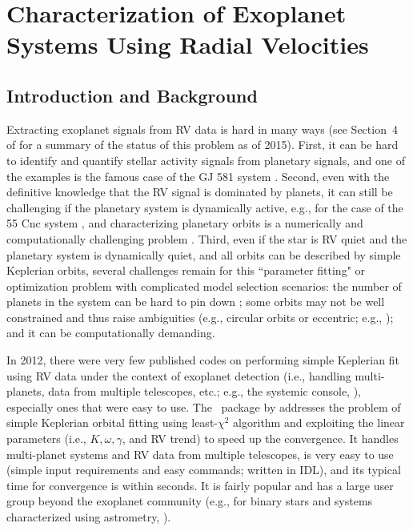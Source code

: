 \chapter{Characterization of Exoplanet Systems Using Radial
  Velocities}


\section{Introduction and Background}\label{boottran:sec:intro}

Extracting exoplanet signals from RV data is hard in many ways (see
Section~4 of \citealt{eprv2015} for a summary of the status of this
problem as of 2015). First, it can be hard to identify and quantify
stellar activity signals from planetary signals, and one of the
examples is the famous case of the GJ 581 system
\citep{2009A&A...507..487M, 2010ApJ...723..954V, 2013AN....334..616H,
  2014Sci...345..440R, 2015Sci...347.1080A,
  2015Sci...347.1080R}. Second, even with the definitive knowledge
that the RV signal is dominated by planets, it can still be
challenging if the planetary system is dynamically active, e.g., for
the case of the 55 Cnc system \citep{2014MNRAS.441..442N}, and
characterizing planetary orbits is a numerically and computationally
challenging problem \citep{2014ApJS..210...11N}. Third, even if the
star is RV quiet and the planetary system is dynamically quiet, and
all orbits can be described by simple Keplerian orbits, several
challenges remain for this ``parameter fitting" or optimization
problem with complicated model selection scenarios: the number of
planets in the system can be hard to pin down
\citep{2015ApJ...814...12V, 2015A&A...584A..72M, 2016arXiv160205200J};
some orbits may not be well constrained and thus raise ambiguities
(e.g., circular orbits or eccentric; e.g.,
\citealt{2010ApJ...709..168A, 2013ApJS..208....2W,
  2015A&A...577A.103K}); and it can be computationally demanding.

In 2012, there were very few published codes on performing simple
Keplerian fit using RV data under the context of exoplanet detection
(i.e., handling multi-planets, data from multiple telescopes, etc.;
e.g., the systemic console, \citealt{2009PASP..121.1016M}), especially
ones that were easy to use. The \rvlin\ package by \cite{rvlin}
addresses the problem of simple Keplerian orbital fitting using
least-$\chi^2$ algorithm and exploiting the linear parameters (i.e.,
$K, \omega, \gamma$, and RV trend) to speed up the convergence. It
handles multi-planet systems and RV data from multiple telescopes, is
very easy to use (simple input requirements and easy commands; written
in IDL), and its typical time for convergence is within seconds. It is
fairly popular and has a large user group beyond the exoplanet
community (e.g., for binary stars and systems characterized using
astrometry, \citealt{2016AJ....151...57K}).

